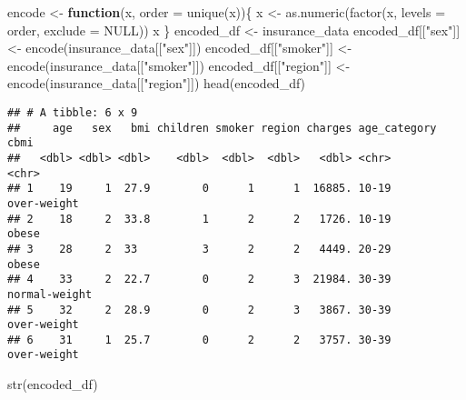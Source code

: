 \documentclass[
]{article}
\newenvironment{Shaded}{\begin{snugshade}}{\end{snugshade}}
\newcommand{\AttributeTok}[1]{\textcolor[rgb]{0.77,0.63,0.00}{#1}}
\newcommand{\ConstantTok}[1]{\textcolor[rgb]{0.00,0.00,0.00}{#1}}
\newcommand{\ControlFlowTok}[1]{\textcolor[rgb]{0.13,0.29,0.53}{\textbf{#1}}}
\newcommand{\FunctionTok}[1]{\textcolor[rgb]{0.00,0.00,0.00}{#1}}
\newcommand{\NormalTok}[1]{#1}
\newcommand{\OtherTok}[1]{\textcolor[rgb]{0.56,0.35,0.01}{#1}}
\newcommand{\StringTok}[1]{\textcolor[rgb]{0.31,0.60,0.02}{#1}}
\begin{document}
\begin{Shaded}
\begin{Highlighting}[]
\NormalTok{encode }\OtherTok{\textless{}{-}} \ControlFlowTok{function}\NormalTok{(x, }\AttributeTok{order =} \FunctionTok{unique}\NormalTok{(x))\{}
\NormalTok{  x }\OtherTok{\textless{}{-}} \FunctionTok{as.numeric}\NormalTok{(}\FunctionTok{factor}\NormalTok{(x, }\AttributeTok{levels =}\NormalTok{ order, }\AttributeTok{exclude =} \ConstantTok{NULL}\NormalTok{))}
\NormalTok{  x}
\NormalTok{\}}
\NormalTok{encoded\_df }\OtherTok{\textless{}{-}}\NormalTok{ insurance\_data}
\NormalTok{encoded\_df[[}\StringTok{"sex"}\NormalTok{]] }\OtherTok{\textless{}{-}} \FunctionTok{encode}\NormalTok{(insurance\_data[[}\StringTok{"sex"}\NormalTok{]])}
\NormalTok{encoded\_df[[}\StringTok{"smoker"}\NormalTok{]] }\OtherTok{\textless{}{-}} \FunctionTok{encode}\NormalTok{(insurance\_data[[}\StringTok{"smoker"}\NormalTok{]])}
\NormalTok{encoded\_df[[}\StringTok{"region"}\NormalTok{]] }\OtherTok{\textless{}{-}} \FunctionTok{encode}\NormalTok{(insurance\_data[[}\StringTok{"region"}\NormalTok{]])}
\FunctionTok{head}\NormalTok{(encoded\_df)}
\end{Highlighting}
\end{Shaded}

\begin{verbatim}
## # A tibble: 6 x 9
##     age   sex   bmi children smoker region charges age_category cbmi         
##   <dbl> <dbl> <dbl>    <dbl>  <dbl>  <dbl>   <dbl> <chr>        <chr>        
## 1    19     1  27.9        0      1      1  16885. 10-19        over-weight  
## 2    18     2  33.8        1      2      2   1726. 10-19        obese        
## 3    28     2  33          3      2      2   4449. 20-29        obese        
## 4    33     2  22.7        0      2      3  21984. 30-39        normal-weight
## 5    32     2  28.9        0      2      3   3867. 30-39        over-weight  
## 6    31     1  25.7        0      2      2   3757. 30-39        over-weight
\end{verbatim}

\begin{Shaded}
\begin{Highlighting}[]
\FunctionTok{str}\NormalTok{(encoded\_df)}
\end{Highlighting}
\end{Shaded}
\end{document}
